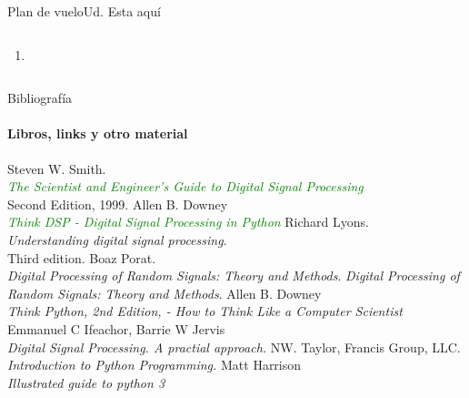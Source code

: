 \begin{frame}{Plan de vuelo}{Ud. Esta aquí}
\begin{columns}[onlytextwidth]
\begin{enumerate}
{
             }
          \item{
             }
       \end{enumerate}
    \end{columns}
 \end{frame}
 \begin{frame}{Bibliografía}
    \framesubtitle{Libros, links y otro material}
    \tiny{
       \begin{thebibliography}{1}
             Steven W. Smith. \\
             \textcolor{green}{\emph{The Scientist and Engineer's Guide to Digital Signal Processing}} \\
             Second Edition, 1999.
             Allen B. Downey \\
             \textcolor{green}{\emph{Think DSP - Digital Signal Processing in Python}}
             Richard Lyons. \\
             \emph {Understanding digital signal processing}. \\
             Third edition.
             Boaz Porat. \\
            \emph{Digital Processing of Random Signals: Theory and Methods}.
             \emph{Digital Processing of Random Signals: Theory and Methods}.
             Allen B. Downey \\
             \emph{ Think Python, 2nd Edition, - How to Think Like a Computer Scientist}
             Emmanuel C Ifeachor, Barrie W Jervis \\
             \emph{ Digital Signal Processing. A practial approach.}
             NW. Taylor, Francis Group, LLC.\\
             \emph{ Introduction to Python Programming.}
             Matt Harrison\\
             \emph{ Illustrated guide to python 3}
       \end{thebibliography}
   }
\end{frame}
